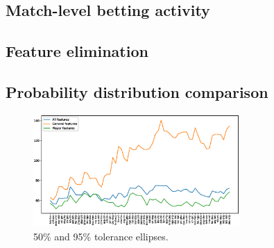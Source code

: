\subsection{Match-level betting activity}
\subsection{Feature elimination}
\subsection{Probability distribution comparison}



\begin{figure}[H]
    \centering
    \includegraphics[width=0.7\textwidth]{img/match_level_score_2014_kelly.eps}
    \caption{50\% and 95\% tolerance ellipses.}
    \label{fig:50_95}
\end{figure}